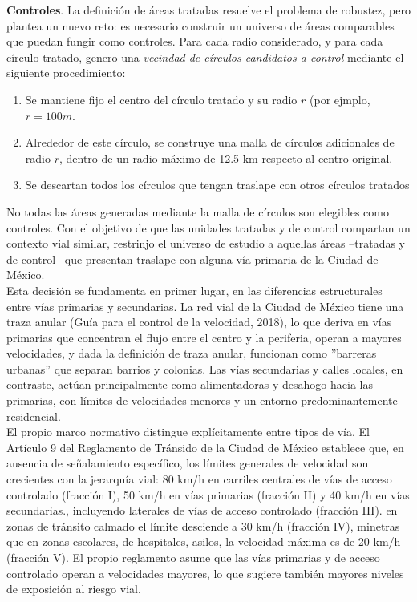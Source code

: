 \textbf{Controles}. La definición de áreas tratadas resuelve el problema de robustez, pero plantea un nuevo reto: es necesario construir un universo de áreas comparables que puedan fungir como controles. Para cada radio considerado, y para cada círculo tratado, genero una \emph{vecindad de círculos candidatos a control} mediante el siguiente procedimiento: 

\begin{enumerate}
    \item Se mantiene fijo el centro del círculo tratado y su radio $r$ (por ejmplo, $r=100m$.
    \item Alrededor de este círculo, se construye una malla de círculos adicionales de radio $r$, dentro de un radio máximo de 12.5 km respecto al centro original.
    \item Se descartan todos los círculos que tengan traslape con otros círculos tratados
\end{enumerate}

No todas las áreas generadas mediante la malla de círculos son elegibles como controles. Con el objetivo de que las unidades tratadas y de control compartan un contexto vial similar, restrinjo el universo de estudio a aquellas áreas --tratadas y de control-- que presentan traslape con alguna vía primaria de la Ciudad de México.\\ 

Esta decisión se fundamenta en primer lugar, en las diferencias estructurales entre vías primarias y secundarias. La red vial de la Ciudad de México tiene una traza anular (Guía para el control de la velocidad, 2018), lo que deriva en vías primarias que concentran el flujo entre el centro y la periferia, operan a mayores velocidades, y dada la definición de traza anular, funcionan como ''barreras urbanas'' que separan barrios y colonias. Las vías secundarias y calles locales, en contraste, actúan principalmente como alimentadoras y desahogo hacia las primarias, con límites de velocidades menores y un entorno predominantemente residencial.\\

El propio marco normativo distingue explícitamente entre tipos de vía. El Artículo 9 del Reglamento de Tránsido de la Ciudad de México establece que, en ausencia de señalamiento específico, los límites generales de velocidad son crecientes con la jerarquía vial: 80 km/h en carriles centrales de vías de acceso controlado (fracción I), 50 km/h en vías primarias (fracción II) y 40 km/h en vías secundarias., incluyendo laterales de vías de acceso controlado (fracción III). en zonas de tránsito calmado el límite desciende a 30 km/h (fracción IV), minetras que en zonas escolares, de hospitales, asilos, la velocidad máxima es de 20 km/h (fracción V). El propio reglamento asume que las vías primarias y de acceso controlado operan a velocidades mayores, lo que sugiere también mayores niveles de exposición al riesgo vial.\\ 

